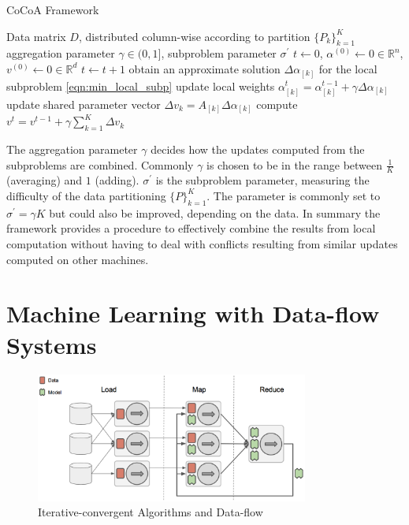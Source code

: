 \begin{algorithm}
\caption{CoCoA Framework}\label{alg:cocoa}
\begin{algorithmic}[1]{}
\DATA Data matrix $D$, distributed column-wise according to partition $\{P_k\}_{k=1}^K$
\INPUT aggregation parameter $\gamma \in (0,1]$, subproblem parameter $\sigma^\prime$
\INIT $t \gets 0$, $\alpha^{(0)} \gets 0 \in \mathbb{R}^n$, $v^{(0)} \gets 0 \in \mathbb{R}^d$ 
\Repeat
\State $t \gets t + 1$
\State obtain an approximate solution $\Delta\alpha_{[k]}$ for the local subproblem \ref{eqn:min_local_subp}
\State update local weights $\alpha_{[k]}^{t} = \alpha_{[k]}^{t-1} + \gamma\Delta\alpha_{[k]}$
\State update shared parameter vector $\Delta v_k = A_{[k]}\Delta\alpha_{[k]}$
\EndFor
\State compute $v^{t} = v^{t-1} + \gamma\sum_{k=1}^K\Delta v_k$
\end{algorithmic}
\end{algorithm}
The aggregation parameter $\gamma$ decides how the updates computed from the subproblems are combined.
Commonly $\gamma$ is chosen to be in the range between $\frac{1}{K}$ (averaging) and $1$ (adding).
$\sigma^\prime$ is the subproblem parameter, measuring the difficulty of the data partitioning $\{P\}_{k=1}^K$.
The parameter is commonly set to $\sigma^\prime = \gamma K$ but could also be improved, depending on the data.
In summary the framework provides a procedure to effectively combine the results from local computation without having to deal with conflicts resulting from similar updates computed on other machines.

\section{Machine Learning with Data-flow Systems}
\label{s:dataflow}
\begin{figure}[ht]
\centering
\includegraphics[width=0.8\textwidth]{img/ml_dataflow.png}
\caption{Iterative-convergent Algorithms and Data-flow}
\label{fig:ml_dataflow}
\end{figure}

